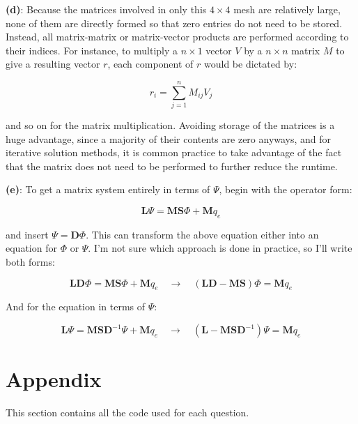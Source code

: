 \documentclass[10pt]{article}
\begin{document}
\textbf{(d)}: Because the matrices involved in only this \(4\times4\) mesh are relatively large, none of them are directly formed so that zero entries do not need to be stored. Instead, all matrix-matrix or matrix-vector products are performed according to their indices. For instance, to multiply a \(n\times1\) vector \(V\) by a \(n\times n\) matrix \(M\) to give a resulting vector \(r\), each component of \(r\) would be dictated by:

\begin{equation}
r_i=\sum_{j=1}^nM_{ij}V_j
\end{equation}

and so on for the matrix multiplication. Avoiding storage of the matrices is a huge advantage, since a majority of their contents are zero anyways, and for iterative solution methods, it is common practice to take advantage of the fact that the matrix does not need to be performed to further reduce the runtime.\newline

\textbf{(e)}: To get a matrix system entirely in terms of \(\Psi\), begin with the operator form:

\begin{equation}
\textbf{L}\Psi=\textbf{M}\textbf{S}\Phi+\textbf{M}q_e
\end{equation}

and insert \(\Psi=\textbf{D}\Phi\). This can transform the above equation either into an equation for \(\Phi\) or \(\Psi\). I'm not sure which approach is done in practice, so I'll write both forms:

\begin{equation}
\textbf{L}\textbf{D}\Phi=\textbf{M}\textbf{S}\Phi+\textbf{M}q_e\quad\rightarrow\quad(\textbf{L}\textbf{D}-\textbf{M}\textbf{S})\Phi=\textbf{M}q_e
\end{equation}

And for the equation in terms of \(\Psi\):

\begin{equation}
\textbf{L}\Psi=\textbf{M}\textbf{S}\textbf{D}^{-1}\Psi+\textbf{M}q_e\quad\rightarrow\quad(\textbf{L}-\textbf{M}\textbf{S}\textbf{D}^{-1})\Psi=\textbf{M}q_e
\end{equation}

\section{Appendix}
This section contains all the code used for each question. 
\begin{comment}
\subsection{Question 3, parts (a) and (b)}

\end{comment}
\end{document}
